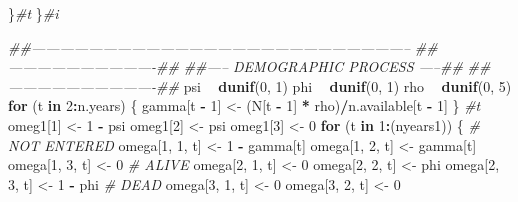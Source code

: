 \documentclass[
]{article}
\newenvironment{Shaded}{\begin{snugshade}}{\end{snugshade}}
\newcommand{\CommentTok}[1]{\textcolor[rgb]{0.56,0.35,0.01}{\textit{#1}}}
\newcommand{\ControlFlowTok}[1]{\textcolor[rgb]{0.13,0.29,0.53}{\textbf{#1}}}
\newcommand{\DecValTok}[1]{\textcolor[rgb]{0.00,0.00,0.81}{#1}}
\newcommand{\KeywordTok}[1]{\textcolor[rgb]{0.13,0.29,0.53}{\textbf{#1}}}
\newcommand{\NormalTok}[1]{#1}
\newcommand{\OperatorTok}[1]{\textcolor[rgb]{0.81,0.36,0.00}{\textbf{#1}}}
\newcommand{\StringTok}[1]{\textcolor[rgb]{0.31,0.60,0.02}{#1}}
\begin{document}
\begin{Shaded}
\begin{Highlighting}[]
\NormalTok{    \}}\CommentTok{#t}
\NormalTok{  \}}\CommentTok{#i}

  
  \CommentTok{##--------------------------------------------------------------------------------}
  \CommentTok{##-------------------------------## }
  \CommentTok{##----- DEMOGRAPHIC PROCESS -----## }
  \CommentTok{##-------------------------------##     }
\NormalTok{  psi }\OperatorTok{~}\StringTok{ }\KeywordTok{dunif}\NormalTok{(}\DecValTok{0}\NormalTok{, }\DecValTok{1}\NormalTok{)}
\NormalTok{  phi }\OperatorTok{~}\StringTok{ }\KeywordTok{dunif}\NormalTok{(}\DecValTok{0}\NormalTok{, }\DecValTok{1}\NormalTok{)}
\NormalTok{  rho }\OperatorTok{~}\StringTok{ }\KeywordTok{dunif}\NormalTok{(}\DecValTok{0}\NormalTok{, }\DecValTok{5}\NormalTok{)}
  \ControlFlowTok{for}\NormalTok{ (t }\ControlFlowTok{in} \DecValTok{2}\OperatorTok{:}\NormalTok{n.years) \{}
\NormalTok{    gamma[t }\OperatorTok{-}\StringTok{ }\DecValTok{1}\NormalTok{] <-}\StringTok{ }\NormalTok{(N[t }\OperatorTok{-}\StringTok{ }\DecValTok{1}\NormalTok{] }\OperatorTok{*}\StringTok{ }\NormalTok{rho)}\OperatorTok{/}\NormalTok{n.available[t }\OperatorTok{-}\StringTok{ }\DecValTok{1}\NormalTok{]}
\NormalTok{  \} }\CommentTok{#t}
\NormalTok{  omeg1[}\DecValTok{1}\NormalTok{] <-}\StringTok{ }\DecValTok{1} \OperatorTok{-}\StringTok{ }\NormalTok{psi}
\NormalTok{  omeg1[}\DecValTok{2}\NormalTok{] <-}\StringTok{ }\NormalTok{psi}
\NormalTok{  omeg1[}\DecValTok{3}\NormalTok{] <-}\StringTok{ }\DecValTok{0}
  \ControlFlowTok{for}\NormalTok{ (t }\ControlFlowTok{in} \DecValTok{1}\OperatorTok{:}\NormalTok{(nyears1)) \{}
    \CommentTok{# NOT ENTERED}
\NormalTok{    omega[}\DecValTok{1}\NormalTok{, }\DecValTok{1}\NormalTok{, t] <-}\StringTok{ }\DecValTok{1} \OperatorTok{-}\StringTok{ }\NormalTok{gamma[t]}
\NormalTok{    omega[}\DecValTok{1}\NormalTok{, }\DecValTok{2}\NormalTok{, t] <-}\StringTok{ }\NormalTok{gamma[t]}
\NormalTok{    omega[}\DecValTok{1}\NormalTok{, }\DecValTok{3}\NormalTok{, t] <-}\StringTok{ }\DecValTok{0}
    \CommentTok{# ALIVE}
\NormalTok{    omega[}\DecValTok{2}\NormalTok{, }\DecValTok{1}\NormalTok{, t] <-}\StringTok{ }\DecValTok{0}
\NormalTok{    omega[}\DecValTok{2}\NormalTok{, }\DecValTok{2}\NormalTok{, t] <-}\StringTok{ }\NormalTok{phi}
\NormalTok{    omega[}\DecValTok{2}\NormalTok{, }\DecValTok{3}\NormalTok{, t] <-}\StringTok{ }\DecValTok{1} \OperatorTok{-}\StringTok{ }\NormalTok{phi}
    \CommentTok{# DEAD}
\NormalTok{    omega[}\DecValTok{3}\NormalTok{, }\DecValTok{1}\NormalTok{, t] <-}\StringTok{ }\DecValTok{0}
\NormalTok{    omega[}\DecValTok{3}\NormalTok{, }\DecValTok{2}\NormalTok{, t] <-}\StringTok{ }\DecValTok{0}

\end{Highlighting}
\end{Shaded}
\end{document}
